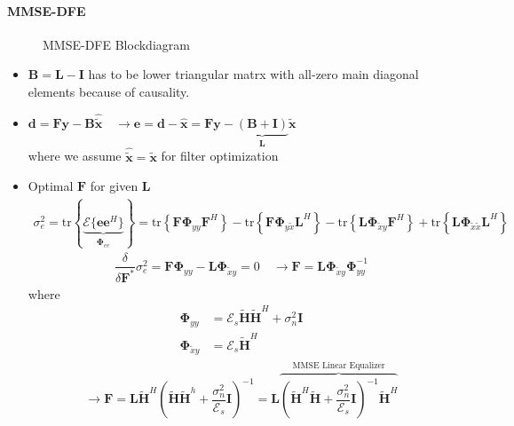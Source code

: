 \documentclass[a4paper, 10pt]{article}
\begin{document}
\paragraph{MMSE-DFE}
\begin{figure}[h]
	\centering
	
	\caption{MMSE-DFE Blockdiagram}
	\label{MMSE_DFE_Block}
\end{figure}
\begin{itemize}
	\item $\mathbf{B}=\mathbf{L}-\mathbf{I}$ has to be lower triangular matrx with all-zero main diagonal elements because of causality.
	\item $\mathbf{d}=\mathbf{Fy}-\mathbf{B}\hat{\tilde{\mathbf{x}}} \quad \rightarrow \mathbf{e}=\mathbf{d}-\hat{\mathbf{x}}=\mathbf{Fy}-\underbrace{(\mathbf{B}+\mathbf{I})}_{\mathbf{L}}\tilde{\mathbf{x}}$\\
	where we assume $\hat{\tilde{\mathbf{x}}}=\tilde{\mathbf{x}}$ for filter optimization
	\item Optimal $\mathbf{F}$ for given $\mathbf{L}$ \\
	\begin{align*}
		\sigma_e^2=\mathrm{tr}\left\{\underbrace{\mathcal{E}\{\mathbf{ee}^H\} }_{\boldsymbol{\Phi}_{ee}}\right\}
		=\mathrm{tr}\left\{\mathbf{F}\boldsymbol{\Phi}_{yy}\mathbf{F}^H\right\}-\mathrm{tr}\left\{\mathbf{F}\boldsymbol{\Phi}_{y \tilde{x}}\mathbf{L}^H\right\}
		-\mathrm{tr}\left\{\mathbf{L}\boldsymbol{\Phi}_{\tilde{x} y}\mathbf{F}^H\right\}
		+\mathrm{tr}\left\{\mathbf{L}\boldsymbol{\Phi}_{\tilde{x} \tilde{x}}\mathbf{L}^H\right\}
	\end{align*}
	\begin{align*}
		\dfrac{\delta}{\delta \mathbf{F}^*}\sigma_e^2=\mathbf{F}\boldsymbol{\Phi}_{yy}-\mathbf{L}\boldsymbol{\Phi}_{\tilde{x}y}=0 \quad \rightarrow \mathbf{F}
		=\mathbf{L}\boldsymbol{\Phi}_{\tilde{x}y}\boldsymbol{\Phi}_{yy}^{-1}
	\end{align*}
	where
	\begin{align*}
		\boldsymbol{\Phi}_{yy}&=\mathcal{E}_s\tilde{\mathbf{H}}\tilde{\mathbf{H}}^H+\sigma_n^2\mathbf{I}\\
		\boldsymbol{\Phi}_{\tilde{x}y}&=\mathcal{E}_s\tilde{\mathbf{H}}^H
	\end{align*}
	\begin{align*}
		\rightarrow \mathbf{F}=\mathbf{L}\tilde{\mathbf{H}}^H(\tilde{\mathbf{H}}\tilde{\mathbf{H}}^h+\dfrac{\sigma_n^2}{\mathcal{E}_s}\mathbf{I})^{-1}
		=\mathbf{L}\overbrace{(\tilde{\mathbf{H}}^H\tilde{\mathbf{H}}+\dfrac{\sigma_n^2}{\mathcal{E}_s}\mathbf{I})^{-1}\tilde{\mathbf{H}}^H}^{\text{MMSE Linear Equalizer}}

\end{align*}
\end{itemize}
\end{document}
